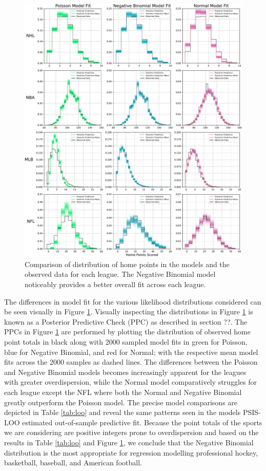 \begin{figure}
	\centering
	\includegraphics[width=\textwidth]{figures/Figure_3.pdf}
	\caption{Comparison of distribution of home points in the models and the observed data for each league. The Negative Binomial model noticeably provides a better overall fit across each league.}
	\label{fig:comparisons}
\end{figure}

The differences in model fit for the various likelihood distributions considered can be seen visually in Figure \ref{fig:comparisons}. Visually inspecting the distributions in Figure \ref{fig:comparisons} is known as a Posterior Predictive Check (PPC) as described in section ??. The PPCs in Figure \ref{fig:comparisons} are performed by plotting the distribution of observed home point totals in black along with 2000 sampled model fits in green for Poisson, blue for Negative Binomial, and red for Normal; with the respective mean model fits across the 2000 samples as dashed lines. The differences between the Poisson and Negative Binomial models becomes increasingly apparent for the leagues with greater overdispersion, while the Normal model comparatively struggles for each league except the NFL where both the Normal and Negative Binomial greatly outperform the Poisson model. The precise model comparisons are depicted in Table \ref{tab:loo} and reveal the same patterns seen in the models PSIS-LOO estimated out-of-sample predictive fit. Because the point totals of the sports we are considering are positive integers prone to overdispersion and based on the results in Table \ref{tab:loo} and Figure \ref{fig:comparisons}, we conclude that the Negative Binomial distribution is the most appropriate for regression modelling professional hockey, basketball, baseball, and American football.

